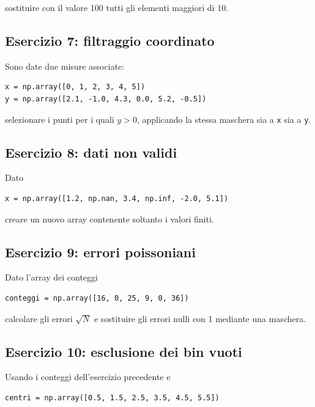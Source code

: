 \documentclass[11pt,a4paper]{book}
\begin{document}
sostituire con il valore 100 tutti gli elementi maggiori di 10.

\subsection*{Esercizio 7: filtraggio coordinato}

Sono date due misure associate:

\begin{lstlisting}
x = np.array([0, 1, 2, 3, 4, 5])
y = np.array([2.1, -1.0, 4.3, 0.0, 5.2, -0.5])
\end{lstlisting}

selezionare i punti per i quali $y>0$, applicando la stessa maschera sia a \texttt{x} sia a \texttt{y}.

\subsection*{Esercizio 8: dati non validi}

Dato

\begin{lstlisting}
x = np.array([1.2, np.nan, 3.4, np.inf, -2.0, 5.1])
\end{lstlisting}

creare un nuovo array contenente soltanto i valori finiti.

\subsection*{Esercizio 9: errori poissoniani}

Dato l'array dei conteggi

\begin{lstlisting}
conteggi = np.array([16, 0, 25, 9, 0, 36])
\end{lstlisting}

calcolare gli errori $\sqrt{N}$ e sostituire gli errori nulli con 1 mediante una maschera.

\subsection*{Esercizio 10: esclusione dei bin vuoti}

Usando i conteggi dell'esercizio precedente e

\begin{lstlisting}
centri = np.array([0.5, 1.5, 2.5, 3.5, 4.5, 5.5])
\end{lstlisting}
\end{document}
